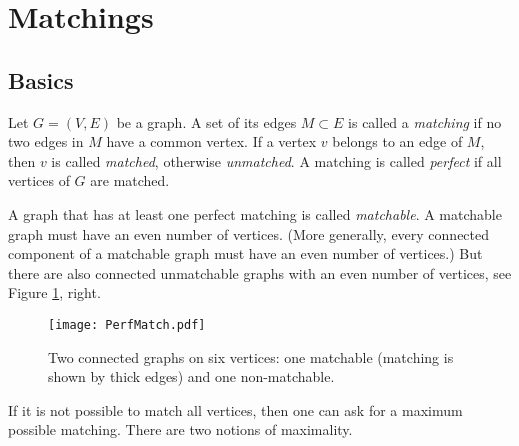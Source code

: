 \begin{page}
\setcounter{section}{4}
\setcounter{subsection}{1}
\setcounter{dfn}{0}
\label{portion:366}

\section{Matchings}

\end{page}

\begin{page}
\setcounter{section}{4}
\setcounter{subsection}{1}
\setcounter{dfn}{0}
\label{portion:368}

\subsection{Basics}

\end{page}

\begin{page}
\setcounter{section}{4}
\setcounter{subsection}{1}
\setcounter{dfn}{1}
\label{portion:370}

\begin{dfn}
Let $G = (V, E)$ be a graph.
A set of its edges $M \subset E$ is called a \emph{matching} if no two edges in $M$ have a common vertex.
If a vertex $v$ belongs to an edge of $M$, then $v$ is called \emph{matched}, otherwise \emph{unmatched}.
A matching is called \emph{perfect} if all vertices of $G$ are matched.
\end{dfn}

\end{page}

\begin{page}
\setcounter{section}{4}
\setcounter{subsection}{1}
\setcounter{dfn}{1}
\label{portion:371}


A graph that has at least one perfect matching is called \emph{matchable}.
A matchable graph must have an even number of vertices.
(More generally, every connected component of a matchable graph must have an even number of vertices.)
But there are also connected unmatchable graphs with an even number of vertices, see Figure \ref{fig:PerfMatch}, right.

\begin{figure}[ht]
\begin{center}
\texttt{[image: PerfMatch.pdf]}
\end{center}
\caption{Two connected graphs on six vertices: one matchable (matching is shown by thick edges) and one non-matchable.}
\label{fig:PerfMatch}
\end{figure}

If it is not possible to match all vertices, then one can ask for a maximum possible matching.
There are two notions of maximality.

\end{page}

